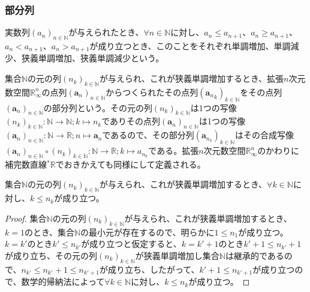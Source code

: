 \documentclass[dvipdfmx]{jsarticle}
\begin{document}
\subsubsection{部分列}%
\begin{dfn}
実数列$\left( a_{n} \right)_{n \in \mathbb{N}}$が与えられたとき、$\forall n \in \mathbb{N}$に対し、$a_{n} \leq a_{n + 1}$、$a_{n} \geq a_{n + 1}$、$a_{n} < a_{n + 1}$、$a_{n} > a_{n + 1}$が成り立つとき、このことをそれぞれ単調増加、単調減少、狭義単調増加、狭義単調減少という。
\end{dfn}
\begin{dfn}
集合$\mathbb{N}$の元の列$\left( n_{k} \right)_{k \in \mathbb{N}}$が与えられ、これが狭義単調増加するとき、拡張$n$次元数空間$\mathbb{R}_{\infty}^{n}$の点列$\left( \mathbf{a}_{n} \right)_{n \in \mathbb{N}}$からつくられたその点列$\left( {\mathbf{a}_{n}}_{k} \right)_{k \in \mathbb{N}}$をその点列$\left( \mathbf{a}_{n} \right)_{n \in \mathbb{N}}$の部分列という。その元の列$\left( n_{k} \right)_{k \in \mathbb{N}}$は1つの写像$\left( n_{k} \right)_{k \in \mathbb{N}}:\mathbb{N} \rightarrow \mathbb{N};k \mapsto n_{k}$でありその点列$\left( \mathbf{a}_{n} \right)_{n \in \mathbb{N}}$は1つの写像$\left( \mathbf{a}_{n} \right)_{n \in \mathbb{N}}:\mathbb{N} \rightarrow \mathbb{R};n \mapsto \mathbf{a}_{n}$であるので、その部分列$\left( \mathbf{a}_{n_{k}} \right)_{k \in \mathbb{N}}$はその合成写像$\left( \mathbf{a}_{n} \right)_{n \in \mathbb{N}} \circ \left( n_{k} \right)_{k \in \mathbb{N}}:\mathbb{N} \rightarrow \mathbb{R};k \mapsto a_{n_{k}}$である。拡張$n$次元数空間$\mathbb{R}_{\infty}^{n}$のかわりに補完数直線${}^{*}\mathbb{R}$でおきかえても同様にして定義される。
\end{dfn}
\begin{thm}\label{4.1.4.10}
集合$\mathbb{N}$の元の列$\left( n_{k} \right)_{k \in \mathbb{N}}$が与えられ、これが狭義単調増加するとき、$\forall k \in \mathbb{N}$に対し、$k \leq n_{k}$が成り立つ。
\end{thm}
\begin{proof}
集合$\mathbb{N}$の元の列$\left( n_{k} \right)_{k \in \mathbb{N}}$が与えられ、これが狭義単調増加するとき、$k = 1$のとき、集合$\mathbb{N}$の最小元が存在するので、明らかに$1 \leq n_{1}$が成り立つ。$k = k'$のとき$k' \leq n_{k'}$が成り立つと仮定すると、$k = k' + 1$のとき$k' + 1 \leq n_{k'} + 1$が成り立ち、その元の列$\left( n_{k} \right)_{k \in \mathbb{N}}$が狭義単調増加し集合$\mathbb{N}$は継承的であるので、$n_{k'} \leq n_{k'} + 1 \leq n_{k' + 1}$が成り立ち、したがって、$k' + 1 \leq n_{k' + 1}$が成り立つので、数学的帰納法によって$\forall k \in \mathbb{N}$に対し、$k \leq n_{k}$が成り立つ。
\end{proof}
\end{document}
